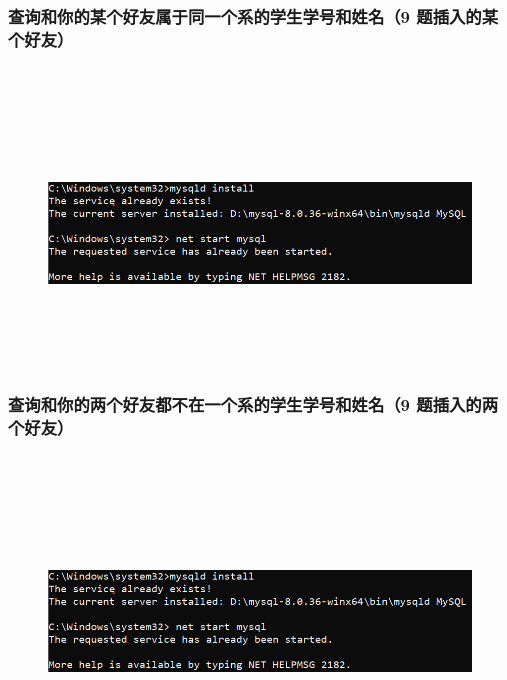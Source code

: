 \documentclass{ctexart}
\begin{document}
\subsubsection{查询和你的某个好友属于同一个系的学生学号和姓名（9 题插入的某个好友）}
\begin{lstlisting}[language=sql]
	
\end{lstlisting}
\begin{figure}[H]
	\centering 
	\includegraphics[height=7cm,width=14cm]{1.png}
	\end{figure}
\subsubsection{查询和你的两个好友都不在一个系的学生学号和姓名（9 题插入的两个好友）}
\begin{lstlisting}[language=sql]
	
\end{lstlisting}
\begin{figure}[H]
	\centering 
	\includegraphics[height=7cm,width=14cm]{1.png}
	\end{figure}
\end{document}
